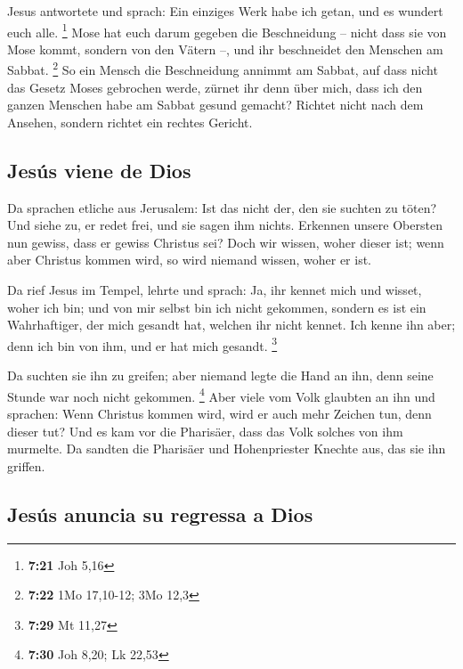  Jesus antwortete und sprach: Ein einziges Werk habe ich
getan, und es wundert euch alle. \footnote{\textbf{7:21} Joh 5,16}
 Mose hat euch darum gegeben die Beschneidung -- nicht
dass sie von Mose kommt, sondern von den Vätern --, und ihr beschneidet
den Menschen am Sabbat. \footnote{\textbf{7:22} 1Mo 17,10-12; 3Mo 12,3}
 So ein Mensch die Beschneidung annimmt am Sabbat, auf
dass nicht das Gesetz Moses gebrochen werde, zürnet ihr denn über mich,
dass ich den ganzen Menschen habe am Sabbat gesund gemacht?
 Richtet nicht nach dem Ansehen, sondern richtet ein
rechtes Gericht.

\hypertarget{jesuxfas-viene-de-dios}{%
\subsection{Jesús viene de Dios}\label{jesuxfas-viene-de-dios}}

 Da sprachen etliche aus Jerusalem: Ist das nicht der,
den sie suchten zu töten?  Und siehe zu, er redet frei,
und sie sagen ihm nichts. Erkennen unsere Obersten nun gewiss, dass er
gewiss Christus sei?  Doch wir wissen, woher dieser ist;
wenn aber Christus kommen wird, so wird niemand wissen, woher er ist.

 Da rief Jesus im Tempel, lehrte und sprach: Ja, ihr
kennet mich und wisset, woher ich bin; und von mir selbst bin ich nicht
gekommen, sondern es ist ein Wahrhaftiger, der mich gesandt hat, welchen
ihr nicht kennet.  Ich kenne ihn aber; denn ich bin von
ihm, und er hat mich gesandt. \footnote{\textbf{7:29} Mt 11,27}

 Da suchten sie ihn zu greifen; aber niemand legte die
Hand an ihn, denn seine Stunde war noch nicht gekommen. \footnote{\textbf{7:30}
  Joh 8,20; Lk 22,53}  Aber viele vom Volk glaubten an
ihn und sprachen: Wenn Christus kommen wird, wird er auch mehr Zeichen
tun, denn dieser tut?  Und es kam vor die Pharisäer, dass
das Volk solches von ihm murmelte. Da sandten die Pharisäer und
Hohenpriester Knechte aus, das sie ihn griffen.

\hypertarget{jesuxfas-anuncia-su-regressa-a-dios}{%
\subsection{Jesús anuncia su regressa a
Dios}\label{jesuxfas-anuncia-su-regressa-a-dios}}

